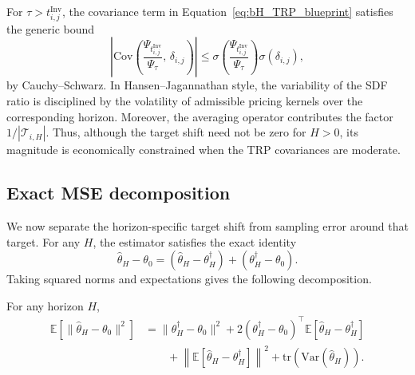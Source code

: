\begin{remark}
	\label{rem:target_shift_magnitude}
	For $\tau > t_{i,j}^{\mathrm{Inv}}$, the covariance term in Equation~\ref{eq:bH_TRP_blueprint} satisfies the generic bound
	\[
	\left|
	\mathrm{Cov}\!\left(
	\frac{\Psi_{t_{i,j}^{\mathrm{Inv}}}}{\Psi_\tau},\,
	\delta_{i,j}
	\right)
	\right|
	\le
	\sigma\!\left(
	\frac{\Psi_{t_{i,j}^{\mathrm{Inv}}}}{\Psi_\tau}
	\right)
	\sigma(\delta_{i,j}),
	\]
	by Cauchy--Schwarz.
	In Hansen--Jagannathan style, the variability of the SDF ratio is disciplined by the volatility of admissible pricing kernels over the corresponding horizon.
	Moreover, the averaging operator contributes the factor $1/|\mathcal{T}_{i,H}|$.
	Thus, although the target shift need not be zero for $H>0$, its magnitude is economically constrained when the TRP covariances are moderate.
\end{remark}

\subsection{Exact MSE decomposition}
\label{sec:appendix_bv_mse}

We now separate the horizon-specific target shift from sampling error around that target.
For any $H$, the estimator satisfies the exact identity
\begin{equation}
	\label{eq:exact_decomp_start_blueprint}
	\hat{\theta}_H - \theta_0
	=
	(\hat{\theta}_H - \theta_H^\dagger)
	+
	(\theta_H^\dagger - \theta_0).
\end{equation}
Taking squared norms and expectations gives the following decomposition.

\begin{proposition}
	\label{prop:exact_mse_blueprint}
	For any horizon $H$,
	\begin{align}
		\label{eq:exact_mse_blueprint}
		\mathbb{E}\!\left[
		\|\hat{\theta}_H - \theta_0\|^2
		\right]
		&=
		\|\theta_H^\dagger - \theta_0\|^2
		+
		2(\theta_H^\dagger - \theta_0)^\top
		\mathbb{E}\!\left[
		\hat{\theta}_H - \theta_H^\dagger
		\right] \nonumber\\
		&\qquad
		+
		\left\|
		\mathbb{E}\!\left[
		\hat{\theta}_H - \theta_H^\dagger
		\right]
		\right\|^2
		+
		\mathrm{tr}\!\left(
		\mathrm{Var}(\hat{\theta}_H)
		\right).
	\end{align}
\end{proposition}

